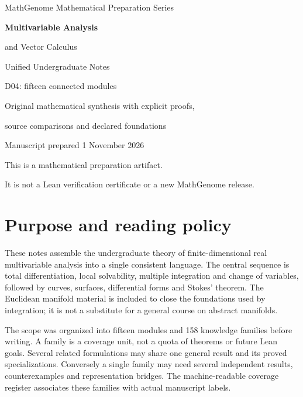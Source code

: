 \documentclass[11pt,oneside,openany]{book}
\theoremstyle{definition}
\theoremstyle{remark}
\newcounter{foundation}
\begin{document}
\frontmatter

\hypersetup{pageanchor=false}
\begin{titlepage}
\centering
\vspace*{24mm}
{\Large MathGenome Mathematical Preparation Series\par}
\vspace{18mm}
{\Huge\bfseries Multivariable Analysis\par}
\vspace{5mm}
{\LARGE and Vector Calculus\par}
\vspace{14mm}
{\Large Unified Undergraduate Notes\par}
\vspace{8mm}
{\large D04: fifteen connected modules\par}
\vfill
{\large Original mathematical synthesis with explicit proofs,\par
source comparisons and declared foundations\par}
\vspace{10mm}
{\large Manuscript prepared 1 November 2026\par}
\vspace{6mm}
{\small This is a mathematical preparation artifact.\par
It is not a Lean verification certificate or a new MathGenome release.\par}
\end{titlepage}
\hypersetup{pageanchor=true}

\chapter*{Purpose and reading policy}
These notes assemble the undergraduate theory of finite-dimensional real
multivariable analysis into a single consistent language. The central sequence
is total differentiation, local solvability, multiple integration and change of
variables, followed by curves, surfaces, differential forms and Stokes' theorem.
The Euclidean manifold material is included to close the foundations used by
integration; it is not a substitute for a general course on abstract manifolds.

The scope was organized into fifteen modules and 158 knowledge families before
writing. A family is a coverage unit, not a quota of theorems or future Lean
goals. Several related formulations may share one general result and its proved
specializations. Conversely a single family may need several independent
results, counterexamples and representation bridges. The machine-readable
coverage register associates these families with actual manuscript labels.
\end{document}
